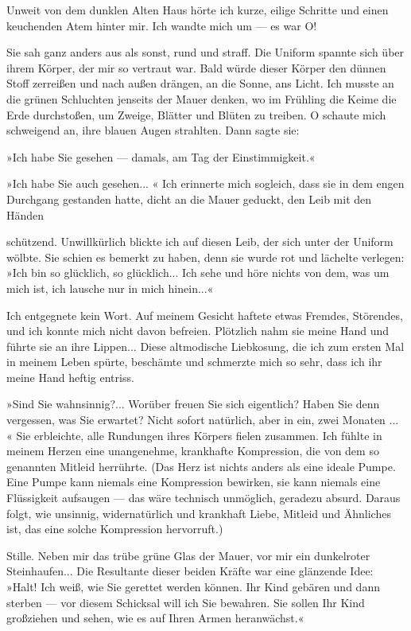 Unweit von dem dunklen Alten Haus hörte ich kurze, eilige Schritte
und einen keuchenden Atem hinter mir. Ich wandte mich um — es war
O!

Sie sah ganz anders aus als sonst, rund und straff. Die Uniform
spannte sich über ihrem Körper, der mir so vertraut war. Bald würde
dieser Körper den dünnen Stoff zerreißen und nach außen drängen, an
die Sonne, ans Licht. Ich musste an die grünen Schluchten jenseits
der Mauer denken, wo im Frühling die Keime die Erde durchstoßen, um
Zweige, Blätter und Blüten zu treiben. O schaute mich schweigend
an, ihre blauen Augen strahlten. Dann sagte sie:

»Ich habe Sie gesehen — damals, am Tag der Einstimmigkeit.«

»Ich habe Sie auch gesehen... « Ich erinnerte mich sogleich, dass
sie in dem engen Durchgang gestanden hatte, dicht an die Mauer
geduckt, den Leib mit den Händen

schützend. Unwillkürlich blickte ich auf diesen Leib, der sich
unter der Uniform wölbte. Sie schien es bemerkt zu haben, denn sie
wurde rot und lächelte verlegen: »Ich bin so glücklich, so
glücklich... Ich sehe und höre nichts von dem, was um mich ist, ich
lausche nur in mich hinein...«

Ich entgegnete kein Wort. Auf meinem Gesicht haftete etwas Fremdes,
Störendes, und ich konnte mich nicht davon befreien. Plötzlich nahm
sie meine Hand und führte sie an ihre Lippen... Diese altmodische
Liebkosung, die ich zum ersten Mal in meinem Leben spürte,
beschämte und schmerzte mich so sehr, dass ich ihr meine Hand
heftig entriss.

»Sind Sie wahnsinnig?... Worüber freuen Sie sich eigentlich? Haben
Sie denn vergessen, was Sie erwartet? Nicht sofort natürlich, aber
in ein, zwei Monaten ... « Sie erbleichte, alle Rundungen ihres
Körpers fielen zusammen. Ich fühlte in meinem Herzen eine
unangenehme, krankhafte Kompression, die von dem so genannten
Mitleid herrührte. (Das Herz ist nichts anders als eine ideale
Pumpe. Eine Pumpe kann niemals eine Kompression bewirken, sie kann
niemals eine Flüssigkeit aufsaugen — das wäre technisch unmöglich,
geradezu absurd. Daraus folgt, wie unsinnig, widernatürlich und
krankhaft Liebe, Mitleid und Ähnliches ist, das eine solche
Kompression hervorruft.)

Stille. Neben mir das trübe grüne Glas der Mauer, vor mir ein
dunkelroter Steinhaufen... Die Resultante dieser beiden Kräfte war
eine glänzende Idee: »Halt! Ich weiß, wie Sie gerettet werden
können. Ihr Kind gebären und dann sterben — vor diesem Schicksal
will ich Sie bewahren. Sie sollen Ihr Kind großziehen und sehen,
wie es auf Ihren Armen heranwächst.«

